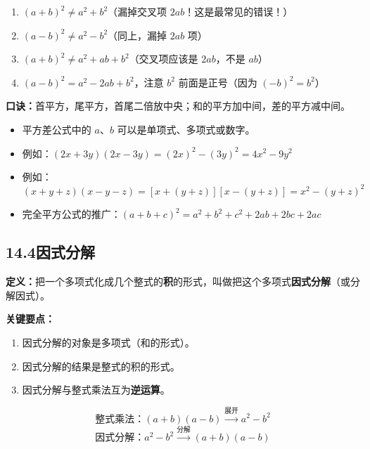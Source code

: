 \documentclass[12pt, a4paper]{ctexart}
\begin{document}
\begin{warnbox}
\begin{enumerate}[nosep]
  \item $(a + b)^2 \neq a^2 + b^2$（漏掉交叉项 $2ab$！这是最常见的错误！）
  \item $(a - b)^2 \neq a^2 - b^2$（同上，漏掉 $2ab$ 项）
  \item $(a + b)^2 \neq a^2 + ab + b^2$（交叉项应该是 $2ab$，不是 $ab$）
  \item $(a - b)^2 = a^2 - 2ab + b^2$，注意 $b^2$ 前面是正号（因为 $(-b)^2 = b^2$）
\end{enumerate}

\textbf{口诀：}首平方，尾平方，首尾二倍放中央；和的平方加中间，差的平方减中间。
\end{warnbox}

\begin{tipbox}[乘法公式的灵活运用]
\begin{itemize}[nosep]
  \item 平方差公式中的 $a$、$b$ 可以是单项式、多项式或数字。
  \item 例如：$(2x+3y)(2x-3y) = (2x)^2 - (3y)^2 = 4x^2 - 9y^2$
  \item 例如：$(x+y+z)(x-y-z) = [x+(y+z)][x-(y+z)] = x^2 - (y+z)^2$
  \item 完全平方公式的推广：$(a+b+c)^2 = a^2+b^2+c^2+2ab+2bc+2ac$
\end{itemize}
\end{tipbox}

\subsection*{14.4\quad 因式分解}

\begin{knowledgebox}[因式分解的概念]
\textbf{定义：}把一个多项式化成几个整式的\textbf{积}的形式，叫做把这个多项式\textbf{因式分解}（或分解因式）。

\textbf{关键要点：}
\begin{enumerate}[nosep]
  \item 因式分解的对象是多项式（和的形式）。
  \item 因式分解的结果是整式的积的形式。
  \item 因式分解与整式乘法互为\textbf{逆运算}。
\end{enumerate}
$$\text{整式乘法：}(a+b)(a-b) \xrightarrow{\text{展开}} a^2 - b^2$$
$$\text{因式分解：}a^2 - b^2 \xrightarrow{\text{分解}} (a+b)(a-b)$$
\end{knowledgebox}
\end{document}
